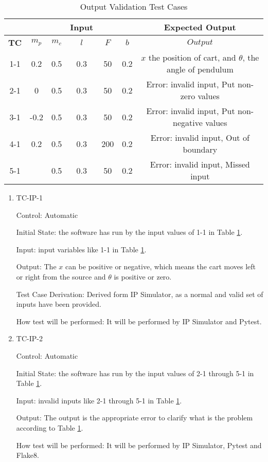 \documentclass[12pt, titlepage]{article}
\begin{document}
\begin{table}
\caption{Output Validation Test Cases}\label{tbl_outValidation}
\vspace*{2mm}
 \begin{tabular}{|c|c c c c c| c|} 
 \hline
    & &&\textbf{Input}&&     & \textbf{Expected Output} \\ \hline

\textbf{TC} &   $m_p$ & $m_c$ & $l$ & $F$ & $b$  &   $Output$ \\ \hline
1-1 &0.2 & 0.5& 0.3& 50& 0.2 &$x$ the position of cart, and $\theta$, the angle of pendulum \\
 \hline
2-1 &0 & 0.5& 0.3& 50& 0.2 & Error: invalid input, Put non-zero values  \\
 \hline
3-1 &-0.2 & 0.5& 0.3& 50& 0.2& Error: invalid input, Put non-negative values\\
 \hline
4-1 & 0.2& 0.5& 0.3& 200& 0.2 & Error: invalid input, Out of boundary \\
 \hline
5-1 & & 0.5& 0.3& 50& 0.2 & Error: invalid input, Missed input \\
  \hline
\end{tabular}

\end{table}		

\begin{enumerate}

\item{TC-IP-1}

Control: Automatic
					
Initial State: the software has run by the input values of 1-1 in Table \ref{tbl_outValidation}.
					
Input: input variables like 1-1 in Table \ref{tbl_outValidation}.
					
Output: The $x$ can be positive or negative, which means the cart moves left or right from the source and $\theta$ is positive or zero.

Test Case Derivation: Derived form IP Simulator, as a normal and valid set of inputs have been provided.
					
How test will be performed: It will be performed by IP Simulator and Pytest.

\item{TC-IP-2}

Control: Automatic
					
Initial State: the software has run by the input values of 2-1 through 5-1 in Table \ref{tbl_outValidation}.
					
Input: invalid inputs like 2-1 through 5-1 in Table \ref{tbl_outValidation}.
					
Output: The output is the appropriate error to clarify what is the problem according to Table \ref{tbl_outValidation}.
					
How test will be performed:  It will be performed by IP Simulator, Pytest and Flake8.
				

\end{enumerate}
\end{document}
